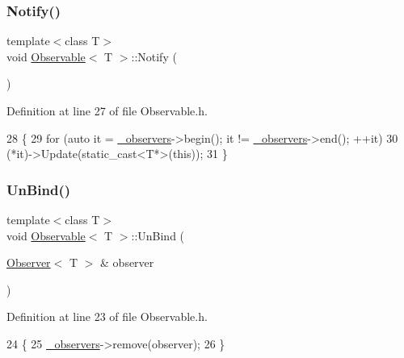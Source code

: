 \subsubsection{\texorpdfstring{Notify()}{Notify()}}
{\footnotesize\ttfamily template$<$class T$>$ \\
void \mbox{\hyperlink{classObservable}{Observable}}$<$ T $>$\+::Notify (\begin{DoxyParamCaption}{ }\end{DoxyParamCaption})\hspace{0.3cm}{\ttfamily [inline]}}



Definition at line 27 of file Observable.\+h.


\begin{DoxyCode}
28     \{
29         \textcolor{keywordflow}{for} (\textcolor{keyword}{auto} it = \mbox{\hyperlink{classObservable_ae6028589035c86e8a9c4375306dca702}{\_observers}}->begin(); it != \mbox{\hyperlink{classObservable_ae6028589035c86e8a9c4375306dca702}{\_observers}}->end(); ++it)
30             (*it)->Update(static\_cast<T*>(\textcolor{keyword}{this}));
31     \}
\end{DoxyCode}
\mbox{\label{classObservable_a141ac9aaacb2bf98b41349413c3487c0}} 
\subsubsection{\texorpdfstring{Un\+Bind()}{UnBind()}}
{\footnotesize\ttfamily template$<$class T$>$ \\
void \mbox{\hyperlink{classObservable}{Observable}}$<$ T $>$\+::Un\+Bind (\begin{DoxyParamCaption}\item[{\mbox{\hyperlink{classObserver}{Observer}}$<$ T $>$ \&}]{observer }\end{DoxyParamCaption})\hspace{0.3cm}{\ttfamily [inline]}}



Definition at line 23 of file Observable.\+h.


\begin{DoxyCode}
24     \{
25         \mbox{\hyperlink{classObservable_ae6028589035c86e8a9c4375306dca702}{\_observers}}->remove(observer);
26     \}
\end{DoxyCode}


